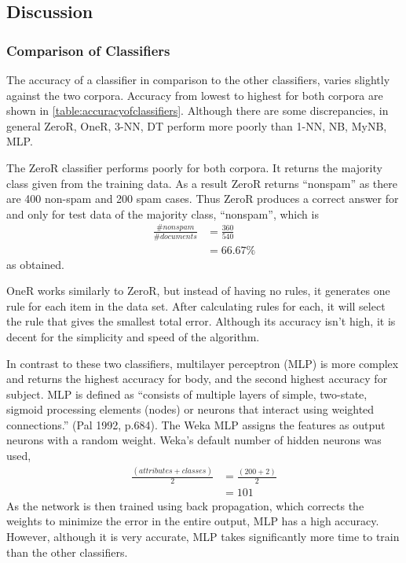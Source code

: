 \documentclass[10pt, a4paper]{article}
\begin{document}
\subsection{Discussion}

%

\subsubsection{Comparison of Classifiers}

The accuracy of a classifier in comparison to the other classifiers, varies slightly against the two corpora.  Accuracy from lowest to highest for both corpora are shown in \autoref{table:accuracyofclassifiers}. Although there are some discrepancies, in general ZeroR, OneR, 3-NN, DT perform more poorly than 1-NN, NB, MyNB, MLP. 

The ZeroR classifier performs poorly for both corpora. It returns the majority class given from the training data. As a result ZeroR returns ``nonspam'' as there are 400 non-spam and 200 spam cases. Thus ZeroR produces a correct answer for and only for test data of the majority class, ``nonspam'', which is 
\begin{align*} \frac{\# nonspam}{\# documents} &=  \frac{360}{540} \\ &= 66.67\% 
\end{align*}
as obtained. 

OneR works similarly to ZeroR, but instead of having no rules, it generates one rule for each item in the data set. After calculating rules for each, it will select the rule that gives the smallest total error. Although its accuracy isn't high, it is decent for the simplicity and speed of the algorithm.

In contrast to these two classifiers, multilayer perceptron (MLP) is more complex and returns the highest accuracy for body, and the second highest accuracy for subject. MLP is defined as ``consists of multiple layers of simple, two-state, sigmoid processing elements (nodes) or neurons that interact using weighted connections.'' (Pal 1992, p.684). The Weka MLP assigns the features as output neurons with a random weight. Weka's default number of hidden neurons\cite{WekaMLP} was used, 
\begin{align*} \frac{(attributes + classes)}{2} &= \frac{(200+2)}{2} \\&= 101
\end{align*}
As the network is then trained using back propagation, which corrects the weights to minimize the error in the entire output, MLP has a high accuracy. However, although it is very accurate, MLP takes significantly more time to train than the other classifiers. 
\end{document}
